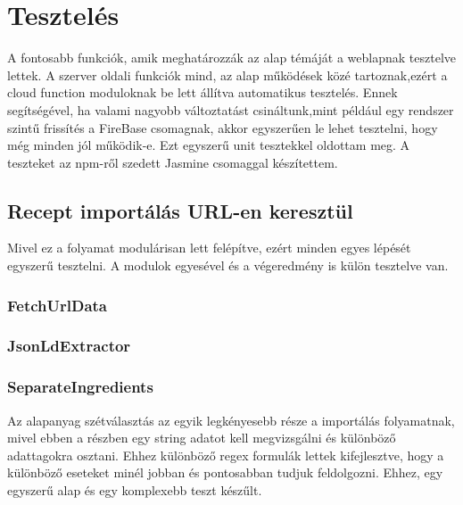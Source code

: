 \documentclass[12pt]{report}
\theoremstyle{definition}
\begin{document}


\chapter{Tesztelés}
A fontosabb funkciók, amik meghatározzák az alap témáját a weblapnak tesztelve lettek. A szerver oldali funkciók mind, az alap működések közé tartoznak,ezért a cloud function moduloknak be lett állítva automatikus tesztelés. Ennek segítségével, ha valami nagyobb változtatást csináltunk,mint például egy rendszer szintű frissítés a FireBase csomagnak, akkor egyszerűen le lehet tesztelni, hogy még minden jól működik-e. Ezt egyszerű unit tesztekkel oldottam meg. A teszteket az npm-ről szedett Jasmine csomaggal készítettem.

\section{Recept importálás URL-en keresztül}
Mivel ez a folyamat modulárisan lett felépítve, ezért minden egyes lépését egyszerű tesztelni. A modulok egyesével és a végeredmény is külön tesztelve van.

\subsection{FetchUrlData}

\subsection{JsonLdExtractor}

\subsection{SeparateIngredients}
Az alapanyag szétválasztás az egyik legkényesebb része a importálás folyamatnak, mivel ebben a részben egy string adatot kell megvizsgálni és különböző adattagokra osztani. Ehhez különböző regex formulák lettek kifejlesztve, hogy a különböző eseteket minél jobban és pontosabban tudjuk feldolgozni. Ehhez, egy egyszerű alap és egy komplexebb teszt készűlt.
\end{document}
